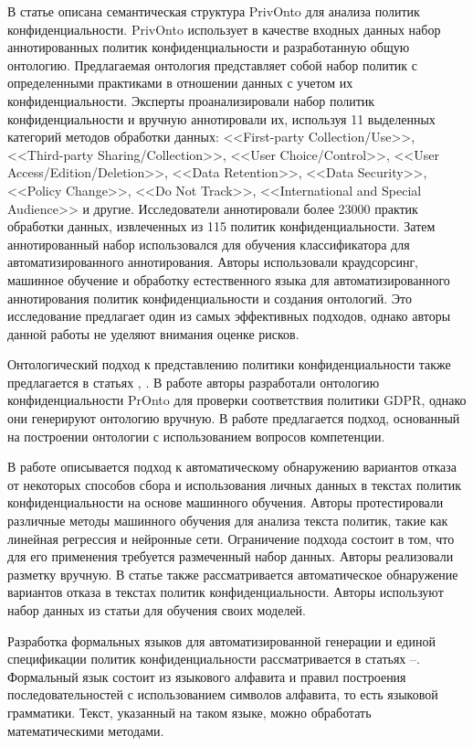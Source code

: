 \documentclass[../main]{subfiles}
\begin{document}
В статье \cite{MDPI6} описана семантическая структура PrivOnto для анализа политик конфиденциальности. PrivOnto использует в качестве входных данных набор аннотированных политик конфиденциальности и разработанную общую онтологию. Предлагаемая онтология представляет собой набор политик с определенными практиками в отношении данных с учетом их конфиденциальности. Эксперты проанализировали набор политик конфиденциальности и вручную аннотировали их, используя 11 выделенных категорий методов обработки данных: <<First-party Collection/Use>>, <<Third-party Sharing/Col\-lection>>, <<User Choice/Control>>, <<User Access/Edition/Deletion>>, <<Data Retention>>, <<Data Security>>, <<Policy Change>>, <<Do Not Track>>, <<International and Special Audience>> и другие. Исследователи аннотировали более 23000 практик обработки данных, извлеченных из 115 политик конфиденциальности. Затем аннотированный набор использовался для обучения классификатора для автоматизированного аннотирования. Авторы использовали краудсорсинг, машинное обучение и обработку естественного языка для автоматизированного аннотирования политик конфиденциальности и создания онтологий. Это исследование предлагает один из самых эффективных подходов, однако авторы данной работы не уделяют внимания оценке рисков.

Онтологический подход к представлению политики конфиденциальности также предлагается в статьях \cite{MDPI7}, \cite{MDPI8}. В работе \cite{MDPI7} авторы разработали онтологию конфиденциальности PrOnto для проверки соответствия политики GDPR, однако они генерируют онтологию вручную. В работе \cite{MDPI8} предлагается подход, основанный на построении онтологии с использованием вопросов компетенции.

В работе \cite{MDPI9} описывается подход к автоматическому обнаружению вариантов отказа от некоторых способов сбора и использования личных данных в текстах политик конфиденциальности на основе машинного обучения. Авторы \cite{MDPI9} протестировали различные методы машинного обучения для анализа текста политик, такие как линейная регрессия и нейронные сети. Ограничение подхода состоит в том, что для его применения требуется размеченный набор данных. Авторы реализовали разметку вручную. В статье \cite{MDPI10} также рассматривается автоматическое обнаружение вариантов отказа в текстах политик конфиденциальности. Авторы используют набор данных из статьи \cite{MDPI6} для обучения своих моделей.

Разработка формальных языков для автоматизированной генерации и единой спецификации политик конфиденциальности рассматривается в статьях \cite{MDPI11}--\cite{MDPI15}. Формальный язык состоит из языкового алфавита и правил построения последовательностей с использованием символов алфавита, то есть языковой грамматики. Текст, указанный на таком языке, можно обработать математическими методами.
\end{document}
